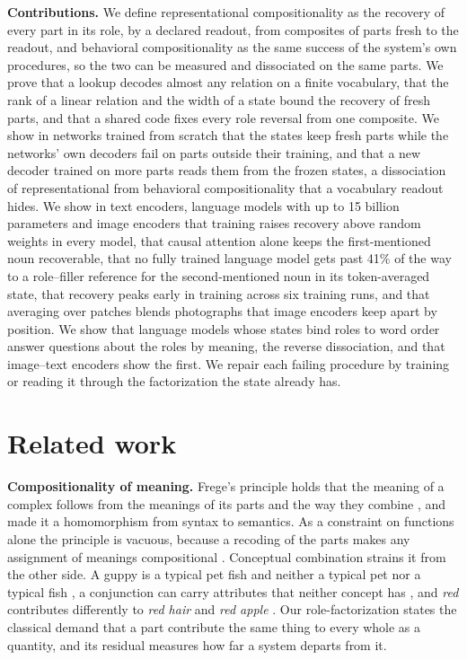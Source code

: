 \documentclass[10pt]{article}
\theoremstyle{plain}
\theoremstyle{remark}
\begin{document}
\textbf{Contributions.} We define representational compositionality as the recovery of every part in its role, by a declared readout, from composites of parts fresh to the readout, and behavioral compositionality as the same success of the system's own procedures, so the two can be measured and dissociated on the same parts. We prove that a lookup decodes almost any relation on a finite vocabulary, that the rank of a linear relation and the width of a state bound the recovery of fresh parts, and that a shared code fixes every role reversal from one composite. We show in networks trained from scratch that the states keep fresh parts while the networks' own decoders fail on parts outside their training, and that a new decoder trained on more parts reads them from the frozen states, a dissociation of representational from behavioral compositionality that a vocabulary readout hides. We show in text encoders, language models with up to 15 billion parameters and image encoders that training raises recovery above random weights in every model, that causal attention alone keeps the first-mentioned noun recoverable, that no fully trained language model gets past 41\% of the way to a role--filler reference for the second-mentioned noun in its token-averaged state, that recovery peaks early in training across six training runs, and that averaging over patches blends photographs that image encoders keep apart by position. We show that language models whose states bind roles to word order answer questions about the roles by meaning, the reverse dissociation, and that image--text encoders show the first. We repair each failing procedure by training or reading it through the factorization the state already has.

\section{Related work}
\label{sec:related}

\textbf{Compositionality of meaning.} Frege's principle holds that the meaning of a complex follows from the meanings of its parts and the way they combine \citep{frege1892,frege1923}, and \citet{montague1970} made it a homomorphism from syntax to semantics. As a constraint on functions alone the principle is vacuous, because a recoding of the parts makes any assignment of meanings compositional \citep{zadrozny1994,westerstahl1998}. Conceptual combination strains it from the other side. A guppy is a typical pet fish and neither a typical pet nor a typical fish \citep{osherson1981,fodor1996}, a conjunction can carry attributes that neither concept has \citep{hampton1987}, and \emph{red} contributes differently to \emph{red hair} and \emph{red apple} \citep{kamp1995}. Our role-factorization states the classical demand that a part contribute the same thing to every whole as a quantity, and its residual measures how far a system departs from it.
\end{document}
